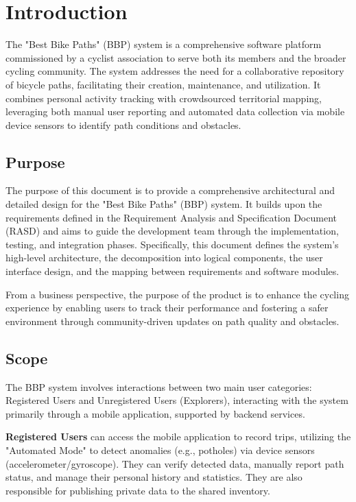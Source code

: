 \section{Introduction}
The "Best Bike Paths" (BBP) system is a comprehensive software platform commissioned by a cyclist association to serve both its members and the broader cycling community. The system addresses the need for a collaborative repository of bicycle paths, facilitating their creation, maintenance, and utilization. It combines personal activity tracking with crowdsourced territorial mapping, leveraging both manual user reporting and automated data collection via mobile device sensors to identify path conditions and obstacles.
\subsection{Purpose}
The purpose of this document is to provide a comprehensive architectural and detailed design for the "Best Bike Paths" (BBP) system. It builds upon the requirements defined in the Requirement Analysis and Specification Document (RASD) and aims to guide the development team through the implementation, testing, and integration phases. Specifically, this document defines the system's high-level architecture, the decomposition into logical components, the user interface design, and the mapping between requirements and software modules.

From a business perspective, the purpose of the product is to enhance the cycling experience by enabling users to track their performance and fostering a safer environment through community-driven updates on path quality and obstacles.

\subsection{Scope}
The BBP system involves interactions between two main user categories: Registered Users and Unregistered Users (Explorers), interacting with the system primarily through a mobile application, supported by backend services.

\textbf{Registered Users} can access the mobile application to record trips, utilizing the "Automated Mode" to detect anomalies (e.g., potholes) via device sensors (accelerometer/gyroscope). They can verify detected data, manually report path status, and manage their personal history and statistics. They are also responsible for publishing private data to the shared inventory.

